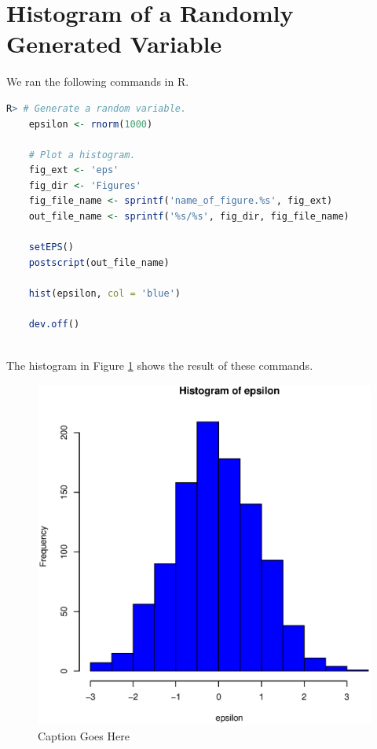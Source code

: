 \documentclass[11pt]{book}
\begin{document}
\section*{Histogram of a Randomly Generated Variable}

We ran the following commands in R.

\begin{lstlisting}[language=R]
R> # Generate a random variable.
    epsilon <- rnorm(1000)
    
    # Plot a histogram.
    fig_ext <- 'eps'
    fig_dir <- 'Figures'
    fig_file_name <- sprintf('name_of_figure.%s', fig_ext)
    out_file_name <- sprintf('%s/%s', fig_dir, fig_file_name)
    
    setEPS()
    postscript(out_file_name)
    
    hist(epsilon, col = 'blue')
    
    dev.off()
    
\end{lstlisting}


The histogram in Figure \ref{fig:example} shows the result of these commands.

\begin{figure}
\centering
\includegraphics[width=\textwidth]{Figures/name_of_figure.eps}
\caption{Caption Goes Here}
\label{fig:example}
\end{figure}
\end{document}
